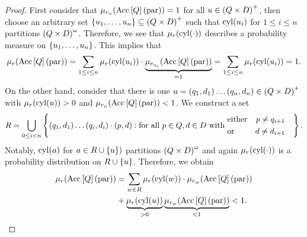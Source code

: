\begin{proof}
  First consider that $\mu_{r_{u}}(\operatorname{Acc}\left[Q\right](\operatorname{par})) = 1$ for all
  $u\in\left(Q\times D\right)^{+}$, then choose an arbitrary set 
  $\left\{u_{1}, \dots, u_{n}\right\}\subseteq\left(Q\times D\right)^{+}$ such that
  $\operatorname{cyl}(u_{i})$ for $1\leq i\leq n$ partitions $\left(Q\times D\right)^{\omega}$.
  Therefore, we see that $\mu_{r}(\operatorname{cyl}(\cdot))$ describes a probability 
  measure on $\left\{u_{1}, \dots, u_{n}\right\}$. This implies that
  \begin{equation*}
    \mu_{r}(\operatorname{Acc}\left[Q\right](\operatorname{par})) = \sum\limits_{1\leq i\leq n}
      \mu_{r}(\operatorname{cyl}(u_{i}))\cdot\underbrace{\mu_{r_{u_{i}}}(
      \operatorname{Acc}\left[Q\right](\operatorname{par}))}_{=1} = \sum\limits_{1\leq i\leq n}
      \mu_{r}(\operatorname{cyl}(u_{i})) = 1.
  \end{equation*}
  On the other hand, consider that there is one 
  $u = \left(q_{1}, d_{1}\right)\dots\left(q_{n}, d_{n}\right)\in\left(Q\times D\right)^{+}$
  with $\mu_{r}(\operatorname{cyl}(u)) > 0$ and 
  $\mu_{r_{u}}(\operatorname{Acc}\left[Q\right](\operatorname{par})) < 1$. We construct a set 
  \begin{equation*}
    R = \bigcup\limits_{0\leq i < n}\left\{
      \left(q_{1}, d_{1}\right)\dots\left(q_{i}, d_{i}\right)\cdot\left(p, d\right):
        \text{for all }p\in Q,d\in D\text{ with }
      \begin{aligned}
          &\text{either}&p\neq q_{i+1}\\
          &\text{or}&d\neq d_{i+1}&
      \end{aligned}
    \right\}.
  \end{equation*}
  Notably, $\operatorname{cyl}(a)$ for $a\in R\cup\left\{u\right\})$ partitions
  $\left(Q\times D\right)^{\omega}$ and again $\mu_{r}(\operatorname{cyl}(\cdot))$ is a
  probability distribution on $R\cup\left\{u\right\}$. Therefore, we obtain
  \begin{align*}
    \mu_{r}(\operatorname{Acc}\left[Q\right](\operatorname{par})) &= \sum\limits_{w\in R}
      \mu_{r}(\operatorname{cyl}(w))\cdot\mu_{r_{w}}(\operatorname{Acc}\left[Q\right](\operatorname{par}))\\
    &+ \underbrace{\mu_{r}(\operatorname{cyl}(u))}_{>0}\underbrace{\mu_{r_{w}}(
      \operatorname{Acc}\left[Q\right](\operatorname{par}))}_{<1} < 1.
  \end{align*}
\end{proof}

